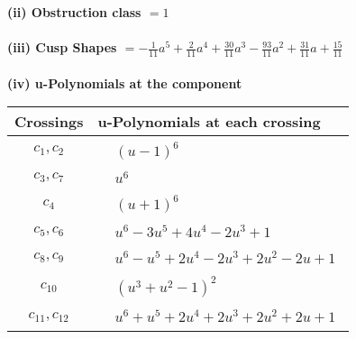\documentclass[1p]{elsarticle_modified}
\theoremstyle{definition}
\begin{document}
\flushleft \textbf{(ii) Obstruction class $= 1$}\\~\\
\flushleft \textbf{(iii) Cusp Shapes $= -\frac{1}{11} a^5+\frac{2}{11} a^4+\frac{30}{11} a^3-\frac{93}{11} a^2+\frac{31}{11} a+\frac{15}{11}$}\\~\\
\newpage\renewcommand{\arraystretch}{1}
\flushleft \textbf{(iv) u-Polynomials at the component}\newline \\
\begin{tabular}{m{50pt}|m{274pt}}
Crossings & \hspace{64pt}u-Polynomials at each crossing \\
\hline $$\begin{aligned}c_{1},c_{2}\end{aligned}$$&$\begin{aligned}
&(u-1)^6
\end{aligned}$\\
\hline $$\begin{aligned}c_{3},c_{7}\end{aligned}$$&$\begin{aligned}
&u^6
\end{aligned}$\\
\hline $$\begin{aligned}c_{4}\end{aligned}$$&$\begin{aligned}
&(u+1)^6
\end{aligned}$\\
\hline $$\begin{aligned}c_{5},c_{6}\end{aligned}$$&$\begin{aligned}
&u^6-3 u^5+4 u^4-2 u^3+1
\end{aligned}$\\
\hline $$\begin{aligned}c_{8},c_{9}\end{aligned}$$&$\begin{aligned}
&u^6- u^5+2 u^4-2 u^3+2 u^2-2 u+1
\end{aligned}$\\
\hline $$\begin{aligned}c_{10}\end{aligned}$$&$\begin{aligned}
&(u^3+u^2-1)^2
\end{aligned}$\\
\hline $$\begin{aligned}c_{11},c_{12}\end{aligned}$$&$\begin{aligned}
&u^6+u^5+2 u^4+2 u^3+2 u^2+2 u+1
\end{aligned}$\\
\hline
\end{tabular}\\~\\
\end{document}
